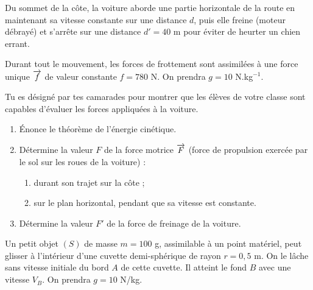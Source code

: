 Du sommet de la côte, la voiture aborde une partie horizontale de la route en maintenant sa vitesse
constante sur une distance $d$, puis elle freine (moteur débrayé) et s'arrête sur une distance
$d' = 40$ m pour éviter de heurter un chien errant.

Durant tout le mouvement, les forces de frottement sont assimilées à une force unique $\overrightarrow{f}$ de
valeur constante $f = 780$ N. On prendra $g = 10$ N.kg$^{-1}$.

Tu es désigné par tes camarades pour montrer que les élèves de votre classe sont capables d'évaluer
les forces appliquées à la voiture.
\begin{enumerate}
  \item Énonce le théorème de l'énergie cinétique.
  \item Détermine la valeur $F$ de la force motrice $\overrightarrow{F}$ (force de propulsion exercée par le sol
        sur les roues de la voiture) :
  \begin{enumerate}[label=2.\arabic*.]
    \item durant son trajet sur la côte ;
    \item sur le plan horizontal, pendant que sa vitesse est constante.
  \end{enumerate}
  \item Détermine la valeur $F'$ de la force de freinage de la voiture.
\end{enumerate}

\clearpage
{}
\begin{minipage}[t]{0.58\textwidth}
\vspace{0pt}
Un petit objet $(S)$ de masse $m = 100$ g, assimilable à un point matériel, peut glisser à
l'intérieur d'une cuvette demi-sphérique de rayon $r = 0,5$ m. On le lâche sans vitesse initiale
du bord $A$ de cette cuvette. Il atteint le fond $B$ avec une vitesse $V_B$.
On prendra $g = 10$ N/kg.
\end{minipage}\hfill
\begin{minipage}[t]{0.38\textwidth}
\vspace{2pt}
\centering
{}
\end{minipage}

